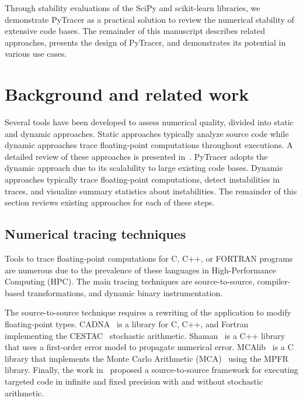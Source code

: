 \documentclass[11pt]{article}
\newcommand{\pytracer}[0]{PyTracer\xspace}
\begin{document}
Through stability evaluations of the
SciPy and scikit-learn libraries, we demonstrate \pytracer as a practical solution to review the numerical stability of extensive code bases. The remainder of this manuscript describes related approaches, presents the design of \pytracer, and demonstrates its potential in various use cases.


\section{Background and related work}

Several tools have been developed to assess numerical quality, divided into static and dynamic approaches. Static approaches typically analyze source code while dynamic approaches trace floating-point computations throughout executions. A detailed review of these approaches is presented in~\cite{cherubin2020tools}. 
\pytracer adopts the dynamic approach due to its scalability to large existing code bases. Dynamic approaches typically trace floating-point computations, detect instabilities in traces, and visualize summary statistics about instabilities. The remainder of this section reviews existing approaches for each of these steps. 


\label{sec:soa}
\subsection{Numerical tracing techniques}
Tools to trace floating-point computations for C, C++, or FORTRAN programs are numerous due to the prevalence of these languages in High-Performance Computing (HPC). 
The main tracing techniques are source-to-source, compiler-based transformations, and dynamic binary instrumentation.

The source-to-source technique requires a rewriting of the application to modify floating-point types. 
CADNA~\cite{jezequel2008cadna} is a library for C, C++, and Fortran implementing the CESTAC~\cite{vignes1993stochastic} stochastic arithmetic. Shaman~\cite{demeure_phd} is a C++ library that uses a first-order error model to propagate numerical error. 
MCAlib~\cite{frechtling2015mcalib} is a C library that implements the Monte Carlo Arithmetic (MCA)~\cite{parker1997monte} using the MPFR~\cite{fousse2007mpfr} library.
Finally, the work in~\cite{tang2016software} proposed a source-to-source framework for executing targeted code in infinite and fixed precision with and without  stochastic arithmetic.
\end{document}
